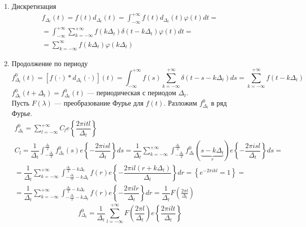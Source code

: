 \begin{enumerate}
\item Дискретизация\\
\begin{gather*}
f_{\Delta_t}(t) = f(t) d_{\Delta_t} (t) = \int_{-\infty}^{+\infty} f(t) d_{\Delta_t} (t) \varphi(t) dt = \\
= \int_{-\infty}^{+\infty} \sum_{k = -\infty}^{+\infty} f(k \Delta_t) \delta(t - k\Delta_t) \varphi(t) dt =\\
= \sum_{k = -\infty}^{\infty} f(k \Delta_t) \varphi(k \Delta_t)
\end{gather*}
\item Продолжение по периоду\\
$$f_{\Delta_t}^0(t) = \left[f(\cdot)\ast d_{\Delta_t}(\cdot) \right](t) = \int_{-\infty}^{+\infty} f(s) \sum_{k = -\infty}^{+\infty} \delta (t - s - k\Delta_t)ds = \sum_{k=-\infty}^{+\infty} f(t - k\Delta_t)$$
$f_{\Delta_t}^0 (t + \Delta_t) = f_{\Delta_t}^0(t)$ --- периодическая с периодом $\Delta_t$.\\
Пусть $F(\lambda)$ --- преобразование Фурье для $f(t)$.
Разложим $f_{\Delta_t}^0$ в ряд Фурье.
\begin{gather*}
f_{\Delta_t}^0 = \sum_{l =  -\infty}^{+\infty} C_l e \left\{ \dfrac{2\pi itl}{\Delta_t} \right\}\\
C_l = \dfrac{1}{\Delta_t} \int_{-\frac{\Delta_t}{2}}^{\frac{\Delta_t}{2}} f_{\Delta_t}^0(s) e \left\{-\dfrac{2\pi isl}{\Delta_t}\right\}ds = \dfrac{1}{\Delta_t} \sum_{k = -\infty}^{+\infty} \int_{-\frac{\Delta_t}{2}}^{\frac{\Delta_t}{2}} f_{\Delta_t}^0(\underbrace{s - k\Delta_t}_r) e \left\{-\dfrac{2\pi isl}{\Delta_t}\right\}ds =\\
= \dfrac{1}{\Delta_t} \sum_{k = -\infty}^{+\infty} \int_{-\frac{\Delta_t}{2} - k\Delta_t}^{\frac{\Delta_t}{2} - k\Delta_t} f(r) e \left\{-\dfrac{2\pi il(r + k\Delta_t)}{\Delta_t}\right\}dr =
\left\{e^{-2\pi i k l} = 1\right\} =\\
=\dfrac{1}{\Delta_t} \sum_{k = -\infty}^{+\infty} \int_{-\frac{\Delta_t}{2} - k\Delta_t}^{\frac{\Delta_t}{2} - k\Delta_t} f(r) e \left\{-\dfrac{2\pi ilr}{\Delta_t}\right\}dr =\dfrac{1}{\Delta_t} F\left(\frac{2 \pi l}{\Delta_t}\right)  
\end{gather*}
\begin{equation}
f_{\Delta_t}^0 = \dfrac{1}{\Delta_t} \sum_{l = -\infty}^{+\infty}  F\left(\frac{2 \pi l}{\Delta_t}\right) e \left\{\frac{2\pi i l t}{\Delta_t} \right\}
\end{equation}
\end{enumerate}
